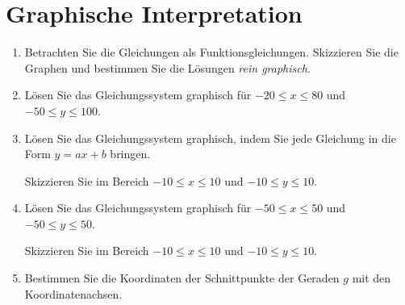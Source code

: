 \section{Graphische Interpretation}
\begin{enumerate}[label=\alph*)]
\item Betrachten Sie die Gleichungen als
 Funktionsgleichungen. Skizzieren Sie die Graphen und bestimmen Sie
 die Lösungen \textit{rein graphisch}.




\newpage
\item

Lösen Sie das Gleichungssystem graphisch für $-20 \le x \le 80$ und
$-50\le y \le 100$.




\newpage
\item
Lösen Sie das Gleichungssystem graphisch, indem Sie jede Gleichung in
die Form $y=ax+b$ bringen.

Skizzieren Sie im Bereich $-10 \le x \le 10$ und $-10 \le y \le 10$.



\newpage

\item
Lösen Sie das Gleichungssystem graphisch für $-50 \le x \le 50$ und
$-50 \le y \le 50$.


Skizzieren Sie im Bereich $-10 \le x \le 10$ und $-10 \le y \le 10$.


\newpage
\item Bestimmen Sie die Koordinaten der Schnittpunkte der Geraden $g$
mit den Koordinatenachsen.


\end{enumerate}
